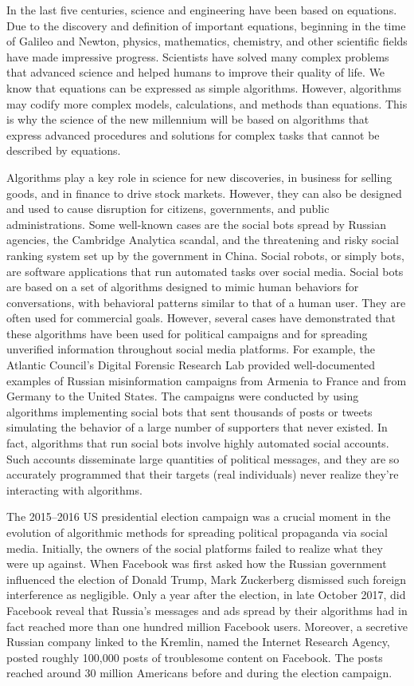 In the last five centuries, science and engineering have been based on equations. Due to the discovery and definition of important equations, beginning in the time of Galileo and Newton, physics, mathematics, chemistry, and other scientific fields have made impressive progress. Scientists have solved many complex problems that advanced science and helped humans to improve their quality of life. We know that equations can be expressed as simple algorithms. However, algorithms may codify more complex models, calculations, and methods than equations. This is why the science of the new millennium will be based on algorithms that express advanced procedures and solutions for complex tasks that cannot be described by equations.

Algorithms play a key role in science for new discoveries, in business for selling goods, and in finance to drive stock markets. However, they can also be designed and used to cause disruption for citizens, governments, and public administrations. Some well-known cases are the social bots spread by Russian agencies, the Cambridge Analytica scandal, and the threatening and risky social ranking \hbox{system} set up by the government in China. Social robots, or simply bots, are software applications that run automated tasks over social media. Social bots are based on a set of algorithms designed to mimic human behaviors for conversations, with behavioral patterns similar to that of a human user. They are often used for commercial goals. However, several cases have demonstrated that these algorithms have been used for political campaigns and for spreading unverified information throughout social media platforms. For example, the Atlantic Council's Digital Forensic Research Lab provided well-documented examples of Russian misinformation campaigns from Armenia to France and from Germany to the United States. The campaigns were conducted by using algorithms implementing social bots that sent thousands of posts or tweets simulating the behavior of a large number of supporters that never existed. In fact, algorithms that run social bots involve highly automated social accounts. Such accounts disseminate large quantities of political messages, and they are so accurately programmed that their targets (real individuals) never realize they're interacting with algorithms.

The 2015--2016 US presidential election campaign was a crucial moment in the evolution of algorithmic methods for spreading political propaganda via social media. Initially, the owners of the social platforms failed to realize what they were up against. When Facebook was first asked how the Russian government influenced the election of Donald Trump, Mark Zuckerberg dismissed such foreign interference as negligible. Only a year after the election, in late October 2017, did Facebook reveal that Russia's messages and ads spread by their algorithms had in fact reached more than one hundred million Facebook\vadjust{\pagebreak} users. Moreover, a \hbox{secretive} Russian company linked to the Kremlin, named the Internet Research Agency, posted roughly 100,000 posts of troublesome content on Facebook. The posts reached around 30 million Americans before and during the election campaign.

